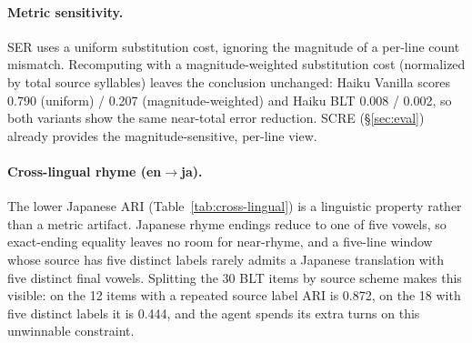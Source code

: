 \documentclass[11pt]{article}
\begin{document}
\paragraph{Metric sensitivity.}
SER uses a uniform substitution cost, ignoring the magnitude of a per-line count mismatch.
Recomputing with a magnitude-weighted substitution cost (normalized by total source syllables) leaves the conclusion unchanged: Haiku Vanilla scores 0.790 (uniform) / 0.207 (magnitude-weighted) and Haiku BLT 0.008 / 0.002, so both variants show the same near-total error reduction.
SCRE (\S\ref{sec:eval}) already provides the magnitude-sensitive, per-line view.

\paragraph{Cross-lingual rhyme (en$\rightarrow$ja).}
The lower Japanese ARI (Table~\ref{tab:cross-lingual}) is a linguistic property rather than a metric artifact.
Japanese rhyme endings reduce to one of five vowels, so exact-ending equality leaves no room for near-rhyme, and a five-line window whose source has five distinct labels rarely admits a Japanese translation with five distinct final vowels.
Splitting the 30 BLT items by source scheme makes this visible: on the 12 items with a repeated source label ARI is 0.872, on the 18 with five distinct labels it is 0.444, and the agent spends its extra turns on this unwinnable constraint.
\end{document}
